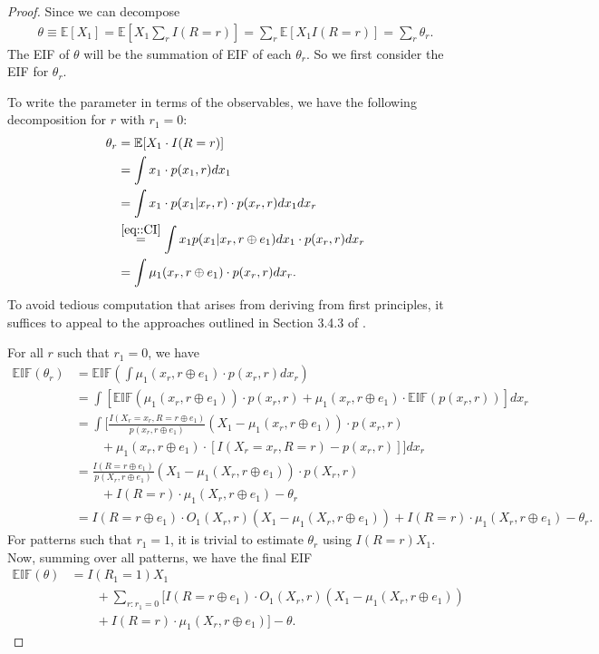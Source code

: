 \documentclass[aos, preprint]{imsart}
\theoremstyle{plain}
\theoremstyle{definition}
\newcommand{\E}{\mbox{$\mathbb{E}$}}
\newcommand{\EIF}{\mathbb{EIF}}
\begin{document}
\begin{appendix}
\begin{proof}
		Since we can decompose 
		\begin{align*}
		\theta \equiv \E[X_1]  = \E\left[X_1\sum_r I(R=r)\right]  =  \sum_r \E[X_1I(R=r)] = \sum_r \theta_r.
		\end{align*}
		The EIF of $\theta$ will be the summation of EIF of each $\theta_r$.
		So we first consider the EIF for $\theta_r$.  

		To write the parameter in terms of the observables, we have the following decomposition
		for $r$ with $r_1 = 0$:
		\begin{align*}
			\theta_r &= \E[X_1 \cdot I(R=r)] \\
			&= \int x_1 \cdot p(x_1,r) dx_1\\
			&= \int x_1 \cdot p(x_1|x_r,r) \cdot p(x_r,r) dx_1dx_r \\
			&\stackrel{\eqref{eq::CI}}{=}  \int x_1  p(x_1|x_r,r\oplus e_1)dx_1 \cdot p(x_r,r) dx_r\\
			&= \int \mu_1(x_r, r\oplus e_1) \cdot p(x_r,r)dx_r.
		\end{align*}
		To avoid tedious computation that arises from deriving from first principles, it suffices to appeal to the approaches outlined in Section 3.4.3 of \cite{kennedy2023semiparametricdoublyrobusttargeted}.
		
		For all $r$ such that $r_1=0$, we have
		\begin{align*}
			\EIF(\theta_r) &= \EIF\left(\int \mu_1(x_r, r\oplus e_1) \cdot p(x_r,r)dx_r \right) \\
			&= \int \left[ \EIF(\mu_1(x_r, r\oplus e_1)) \cdot p(x_r,r) + \mu_1(x_r, r\oplus e_1) \cdot \EIF(p(x_r,r)) \right]dx_r \\
			&= \int \biggr[\frac{I(X_r=x_r,R=r\oplus e_1)}{p(x_r,r\oplus e_1)}(X_1 - \mu_1(x_r, r\oplus e_1)) \cdot p(x_r,r) \\
			&\qquad + \mu_1(x_r, r\oplus e_1) \cdot [I(X_r=x_r, R=r) - p(x_r,r)] \biggr] dx_r\\
			&= \frac{I(R=r\oplus e_1)}{p(X_r, r\oplus e_1)} (X_1 - \mu_1(X_r, r\oplus e_1)) \cdot p(X_r,r) \\
			& \qquad + I(R=r) \cdot \mu_1(X_r, r\oplus e_1) - \theta_r \\
			&= I(R=r\oplus e_1)\cdot O_1(X_r,r) (X_1 - \mu_1(X_r, r\oplus e_1)) + I(R=r) \cdot \mu_1(X_r, r\oplus e_1) - \theta_r.
		\end{align*}
		For patterns such that $r_1=1$, it is trivial to estimate $\theta_r$ using $I(R=r)X_1$.\\
	
		Now, summing over all patterns, we have the final EIF
		\begin{align*}
			\EIF(\theta) &= I(R_1=1)X_1 \\
			&\qquad + \sum_{r:r_1=0} \biggr[I(R=r\oplus e_1)\cdot O_1(X_r,r) (X_1 - \mu_1(X_r, r\oplus e_1)) \\
			&\qquad+ I(R=r) \cdot \mu_1(X_r, r\oplus e_1)\biggr] - \theta.
		\end{align*}
	\end{proof}


\end{appendix}
\end{document}
